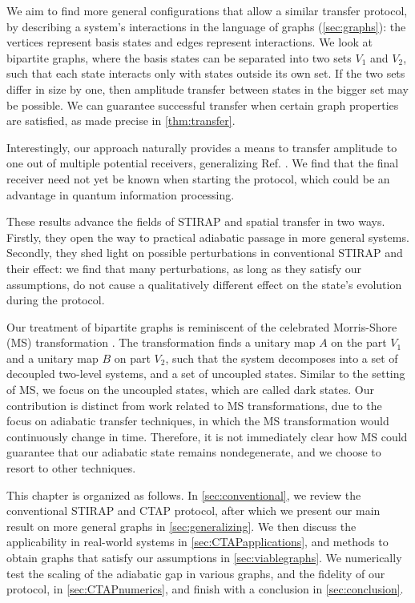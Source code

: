 %

We aim to find more general configurations that allow a similar transfer protocol, by describing a system's interactions in the language of graphs (\cref{sec:graphs}): the vertices represent basis states and edges represent interactions. We look at bipartite graphs, where the basis states can be separated into two sets $V_1$ and $V_2$, such that each state interacts only with states outside its own set. 
If the two sets differ in size by one, then amplitude transfer between states in the bigger set may be possible. We can guarantee successful transfer when certain graph properties are satisfied, as made precise in \cref{thm:transfer}. 

Interestingly, our approach naturally provides a means to transfer amplitude to one out of multiple potential receivers, generalizing Ref. \cite{Greentree2006}. We find that the final receiver need not yet be known when starting the protocol, which could be an advantage in quantum information processing. 

These results advance the fields of STIRAP and spatial transfer in two ways. Firstly, they open the way to practical adiabatic passage in more general systems. Secondly, they shed light on possible perturbations in conventional STIRAP and their effect: we find that many perturbations, as long as they satisfy our assumptions, do not cause a qualitatively different effect on the state's evolution during the protocol. 

Our treatment of bipartite graphs is reminiscent of the celebrated Morris-Shore (MS) transformation \cite{Morris1983}. The transformation finds a unitary map $A$ on the part $V_1$ and a unitary map $B$ on part $V_2$, such that the system decomposes into a set of decoupled two-level systems, and a set of uncoupled states. Similar to the setting of MS, we focus on the uncoupled states, which are called dark states. Our contribution is distinct from work related to MS transformations, due to the focus on adiabatic transfer techniques, in which the MS transformation would continuously change in time. Therefore, it is not immediately clear how MS could guarantee that our adiabatic state remains nondegenerate, and we choose to resort to other techniques. 

 
This chapter is organized as follows. In \cref{sec:conventional}, we review the conventional STIRAP and CTAP protocol, after which we present our main result on more general graphs in \cref{sec:generalizing}. We then discuss the applicability in real-world systems in \cref{sec:CTAPapplications}, and methods to obtain graphs that satisfy our assumptions in \cref{sec:viablegraphs}. We numerically test the scaling of the adiabatic gap in various graphs, and the fidelity of our protocol, in \cref{sec:CTAPnumerics}, and finish with a conclusion in \cref{sec:conclusion}.


